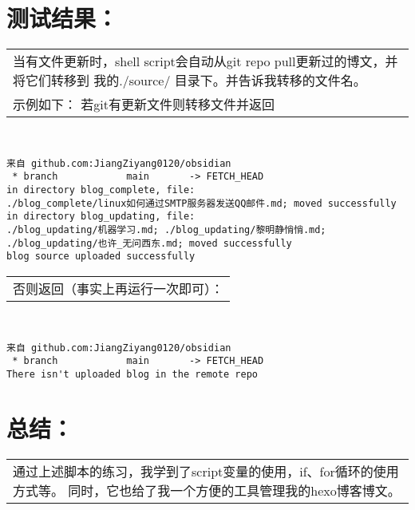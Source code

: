 \documentclass{ctexart}
\begin{document}
    \section{测试结果：}
    \begin{tabular}{p{\columnwidth}}
        当有文件更新时，shell script会自动从git repo pull更新过的博文，并将它们转移到
        我的./source/ 目录下。并告诉我转移的文件名。\\
        示例如下：
        若git有更新文件则转移文件并返回
    \end{tabular}\\
    \begin{lstlisting}
来自 github.com:JiangZiyang0120/obsidian
 * branch            main       -> FETCH_HEAD
in directory blog_complete, file:
./blog_complete/linux如何通过SMTP服务器发送QQ邮件.md; moved successfully
in directory blog_updating, file:
./blog_updating/机器学习.md; ./blog_updating/黎明静悄悄.md; ./blog_updating/也许_无问西东.md; moved successfully
blog source uploaded successfully
    \end{lstlisting}
    \begin{tabular}{p{\columnwidth}}
        否则返回（事实上再运行一次即可）：
    \end{tabular}\\
    \begin{lstlisting}
来自 github.com:JiangZiyang0120/obsidian
 * branch            main       -> FETCH_HEAD
There isn't uploaded blog in the remote repo
    \end{lstlisting}

    \section{总结：}
    \begin{tabular}{p{\columnwidth}}
        通过上述脚本的练习，我学到了script变量的使用，if、for循环的使用方式等。
        同时，它也给了我一个方便的工具管理我的hexo博客博文。\\
    \end{tabular}
\end{document}
